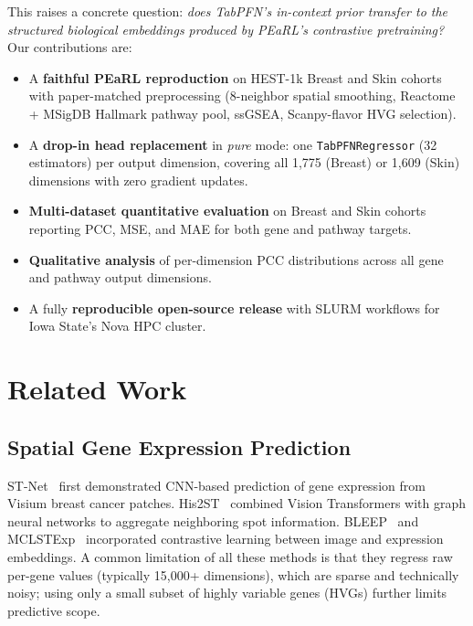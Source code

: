 \documentclass[conference]{IEEEtran}
\begin{document}
This raises a concrete question:
\textit{does TabPFN's in-context prior transfer to the structured biological
embeddings produced by PEaRL's contrastive pretraining?}
Our contributions are:
\begin{itemize}
    \item A \textbf{faithful PEaRL reproduction} on HEST-1k Breast and Skin
          cohorts with paper-matched preprocessing (8-neighbor spatial smoothing,
          Reactome + MSigDB Hallmark pathway pool, ssGSEA, Scanpy-flavor HVG
          selection).
    \item A \textbf{drop-in head replacement} in \textit{pure} mode: one
          \texttt{TabPFNRegressor} (32 estimators) per output dimension, covering
          all 1{,}775 (Breast) or 1{,}609 (Skin) dimensions with zero
          gradient updates.
    \item \textbf{Multi-dataset quantitative evaluation} on Breast and Skin
          cohorts reporting PCC, MSE, and MAE for both gene and pathway targets.
    \item \textbf{Qualitative analysis} of per-dimension PCC distributions
          across all gene and pathway output dimensions.
    \item A fully \textbf{reproducible open-source release} with SLURM workflows
          for Iowa State's Nova HPC cluster.
\end{itemize}

\section{Related Work}
\label{sec:related}

\subsection{Spatial Gene Expression Prediction}

ST-Net~\cite{stnet} first demonstrated CNN-based prediction of gene expression
from Visium breast cancer patches.
His2ST~\cite{his2st} combined Vision Transformers with graph neural networks
to aggregate neighboring spot information.
BLEEP~\cite{bleep} and MCLSTExp~\cite{mclstexp} incorporated contrastive
learning between image and expression embeddings.
A common limitation of all these methods is that they regress raw per-gene
values (typically 15{,}000+ dimensions), which are sparse and technically noisy;
using only a small subset of highly variable genes (HVGs) further limits
predictive scope.
\end{document}
